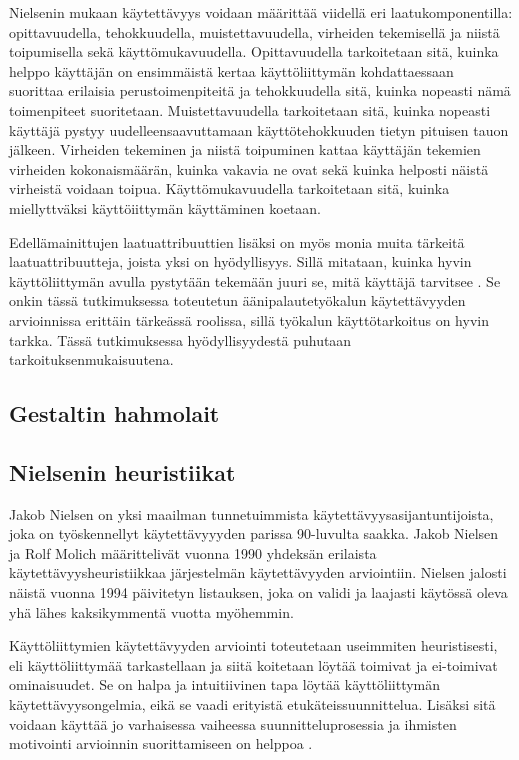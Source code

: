 \documentclass[utf8]{gradu3}
\begin{document}
Nielsenin \parencite[][]{intro-usability} mukaan käytettävyys voidaan määrittää viidellä eri laatukomponentilla: opittavuudella, tehokkuudella, muistettavuudella, virheiden tekemisellä ja niistä toipumisella sekä käyttömukavuudella. Opittavuudella tarkoitetaan sitä, kuinka helppo käyttäjän on ensimmäistä kertaa käyttöliittymän kohdattaessaan suorittaa erilaisia perustoimenpiteitä ja tehokkuudella sitä, kuinka nopeasti nämä toimenpiteet suoritetaan. Muistettavuudella tarkoitetaan sitä, kuinka nopeasti käyttäjä pystyy uudelleensaavuttamaan käyttötehokkuuden tietyn pituisen tauon jälkeen. Virheiden tekeminen ja niistä toipuminen kattaa käyttäjän tekemien virheiden kokonaismäärän, kuinka vakavia ne ovat sekä kuinka helposti näistä virheistä voidaan toipua. Käyttömukavuudella tarkoitetaan sitä, kuinka miellyttväksi käyttöiittymän käyttäminen koetaan.

Edellämainittujen laatuattribuuttien lisäksi on myös monia muita tärkeitä laatuattribuutteja, joista yksi on hyödyllisyys. Sillä mitataan, kuinka hyvin käyttöliittymän avulla pystytään tekemään juuri se, mitä käyttäjä tarvitsee \parencite[][]{intro-usability}. Se onkin tässä tutkimuksessa toteutetun äänipalautetyökalun käytettävyyden arvioinnissa erittäin tärkeässä roolissa, sillä työkalun käyttötarkoitus on hyvin tarkka. Tässä tutkimuksessa hyödyllisyydestä puhutaan tarkoituksenmukaisuutena.


\subsection{Gestaltin hahmolait}

\subsection{Nielsenin heuristiikat}

Jakob Nielsen on yksi maailman tunnetuimmista käytettävyysasijantuntijoista, joka on työskennellyt käytettävyyyden parissa 90-luvulta saakka. Jakob Nielsen ja Rolf Molich \parencite[][]{improving-human} määrittelivät vuonna 1990 yhdeksän erilaista käytettävyysheuristiikkaa järjestelmän käytettävyyden arviointiin. Nielsen \parencite[][]{enhancing} jalosti näistä vuonna 1994 päivitetyn listauksen, joka on validi ja laajasti käytössä oleva yhä lähes kaksikymmentä vuotta myöhemmin. 

Käyttöliittymien käytettävyyden arviointi toteutetaan useimmiten heuristisesti, eli käyttöliittymää tarkastellaan ja siitä koitetaan löytää toimivat ja ei-toimivat ominaisuudet. Se on halpa ja intuitiivinen tapa löytää käyttöliittymän käytettävyysongelmia, eikä se vaadi erityistä etukäteissuunnittelua. Lisäksi sitä voidaan käyttää jo varhaisessa vaiheessa suunnitteluprosessia ja ihmisten motivointi arvioinnin suorittamiseen on helppoa \parencite[][]{heuristic-evaluation}.
\end{document}
